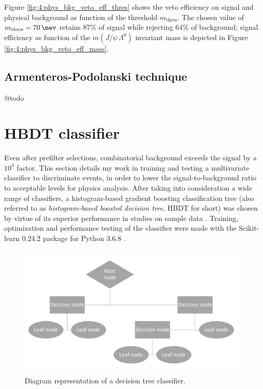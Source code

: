 Figure \ref{fig:4:phys_bkg_veto_eff_thres} shows the veto efficiency on \demonstratorshort signal and \physbkgshort physical background as function of the threshold $m_\text{thres}$.
The chosen value of $m_\text{thres} = \SI{70}{\mev}$ retains 87\% of signal while rejecting 64\% of background;
signal efficiency as function of the $m(J/\psi\,\Lambda^0)$ invariant mass is depicted in Figure \ref{fig:4:phys_bkg_veto_eff_mass}.

\subsection{Armenteros-Podolanski technique}
@todo

\section{HBDT classifier}
\label{sec:HBDT}
Even after prefilter selections, combinatorial background exceeds the signal by a ${10}^3$ factor.
This section details my work in training and testing a multivariate classifier to discriminate \demonstratorshort events, in order to lower the signal-to-background ratio to acceptable levels for physics analysis.
After taking into consideration a wide range of classifiers, a histogram-based gradient boosting classification tree (also referred to as \textit{histogram-based boosted decision tree}, HBDT for short) was chosen by virtue of its superior performance in studies on sample data \cite{Pessina:BSc:2020}.
Training, optimization and performance testing of the classifier were made with the Scikit-learn 0.24.2 package \cite{scikit-learn} for Python 3.6.8 \cite{10.5555/1593511}.

\begin{figure}
	\centering
	\includegraphics[height=.3\textheight]{graphics/04-event_selection/decision_tree.pdf}
	\caption{Diagram representation of a decision tree classifier.}
	\label{fig:4:decision_tree}
\end{figure}

